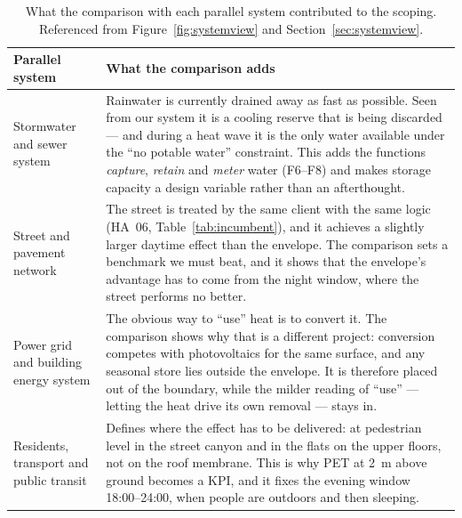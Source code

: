 \begin{table}[htbp]
\centering
\caption{What the comparison with each parallel system contributed to the
scoping. Referenced from Figure~\ref{fig:systemview} and
Section~\ref{sec:systemview}.}
\label{tab:parallel}
\renewcommand{\arraystretch}{1.2}
\small
\begin{tabularx}{\textwidth}{L{3.6cm} X}
\toprule
\textbf{Parallel system} & \textbf{What the comparison adds} \\
\midrule
Stormwater and sewer system
& Rainwater is currently drained away as fast as possible. Seen from our system
  it is a cooling reserve that is being discarded --- and during a heat wave it
  is the only water available under the \enquote{no potable water} constraint.
  This adds the functions \emph{capture}, \emph{retain} and \emph{meter} water
  (F6--F8) and makes storage capacity a design variable rather than an
  afterthought. \\
Street and pavement network
& The street is treated by the same client with the same logic (HA~06,
  Table~\ref{tab:incumbent}), and it achieves a slightly larger daytime effect
  than the envelope. The comparison sets a benchmark we must beat, and it shows
  that the envelope's advantage has to come from the night window, where the
  street performs no better. \\
Power grid and building energy system
& The obvious way to \enquote{use} heat is to convert it. The comparison shows
  why that is a different project: conversion competes with photovoltaics for
  the same surface, and any seasonal store lies outside the envelope. It is
  therefore placed out of the boundary, while the milder reading of
  \enquote{use} --- letting the heat drive its own removal --- stays in. \\
Residents, transport and public transit
& Defines where the effect has to be delivered: at pedestrian level in the
  street canyon and in the flats on the upper floors, not on the roof membrane.
  This is why PET at \qty{2}{\metre} above ground becomes a KPI, and it fixes
  the evening window 18:00--24:00, when people are outdoors and then sleeping. \\
\bottomrule
\end{tabularx}
\end{table}
